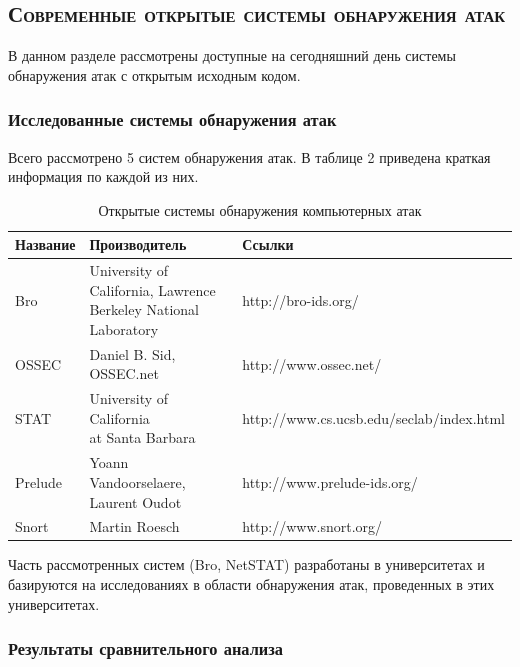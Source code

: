 \subsection{\textsc{Современные открытые системы обнаружения атак}}

В данном разделе рассмотрены доступные на сегодняшний день системы
обнаружения атак с открытым исходным кодом.

\subsubsection{Исследованные системы обнаружения атак}

Всего рассмотрено 5 систем обнаружения атак. В таблице 2 приведена краткая информация по каждой из них.

\begin{table}[htb]
\centering
\caption{Открытые системы обнаружения компьютерных атак}

\begin{tabular}{ | l | l | l | }

\hline
Название & Производитель & Ссылки \\ \hline
Bro & \specialcell{University of California, Lawrence\\Berkeley National Laboratory} & http://bro-ids.org/ \\ \hline
OSSEC & Daniel B. Sid, OSSEC.net & http://www.ossec.net/ \\ \hline
STAT & \specialcell{University of California\\at Santa Barbara} & http://www.cs.ucsb.edu/seclab/index.html \\ \hline
Prelude & \specialcell{Yoann Vandoorselaere,\\Laurent Oudot} & http://www.prelude-ids.org/ \\ \hline
Snort & Martin Roesch & http://www.snort.org/ \\ \hline

\end{tabular}
\end{table}


Часть рассмотренных систем (Bro, NetSTAT) разработаны в университетах и
базируются на исследованиях в области обнаружения атак, проведенных в этих
университетах.

\subsubsection{Результаты сравнительного анализа}

